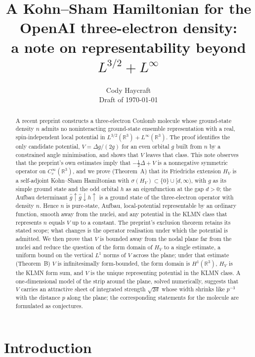 \documentclass[11pt,a4paper]{article}
\title{A Kohn--Sham Hamiltonian for the OpenAI three-electron density:\\ a note on representability beyond $L^{3/2}+L^\infty$}
\author{Cody Haycraft\\[2pt] \small Draft of \today}
\date{}
\theoremstyle{plain}
\theoremstyle{definition}
\theoremstyle{remark}
\newcommand{\R}{\mathbb{R}}
\newcommand{\LL}{L^{3/2}(\R^3)+L^\infty(\R^3)}
\newcommand{\hg}{\hat g}
\begin{document}
\maketitle

\begin{abstract}
A recent preprint constructs a three-electron Coulomb molecule whose ground-state density $n$ admits no noninteracting ground-state ensemble representation with a real, spin-independent local potential in $\LL$. The proof identifies the only candidate potential, $V=\Delta g/(2g)$ for an even orbital $g$ built from $n$ by a constrained angle minimisation, and shows that $V$ leaves that class. This note observes that the preprint's own estimates imply that $-\tfrac12\Delta+V$ is a nonnegative symmetric operator on $C_c^\infty(\R^3)$, and we prove (Theorem~A) that its Friedrichs extension $H_V$ is a self-adjoint Kohn--Sham Hamiltonian with $\sigma(H_V)\subset\{0\}\cup[d,\infty)$, with $g$ as its simple ground state and the odd orbital $h$ as an eigenfunction at the gap $d>0$; the Aufbau determinant $\hg\!\uparrow\hg\!\downarrow h\!\uparrow$ is a ground state of the three-electron operator with density $n$. Hence $n$ is pure-state, Aufbau, local-potential representable by an ordinary function, smooth away from the nuclei, and any potential in the KLMN class that represents $n$ equals $V$ up to a constant. The preprint's exclusion theorem retains its stated scope; what changes is the operator realisation under which the potential is admitted. We then prove that $V$ is bounded away from the nodal plane far from the nuclei and reduce the question of the form domain of $H_V$ to a single estimate, a uniform bound on the vertical $L^1$ norms of $V$ across the plane; under that estimate (Theorem~B) $V$ is infinitesimally form-bounded, the form domain is $H^1(\R^3)$, $H_V$ is the KLMN form sum, and $V$ is the unique representing potential in the KLMN class. A one-dimensional model of the strip around the plane, solved numerically, suggests that $V$ carries an attractive sheet of integrated strength $\sqrt{2d}$ whose width shrinks like $p^{-3}$ with the distance $p$ along the plane; the corresponding statements for the molecule are formulated as conjectures.
\end{abstract}

\section{Introduction}
\end{document}
